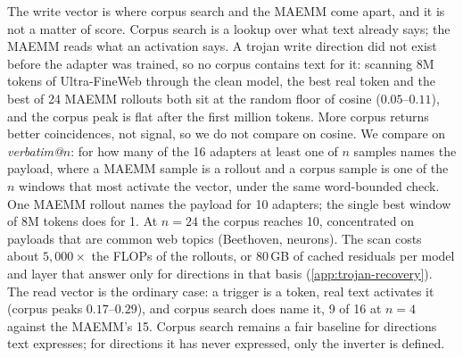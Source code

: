 The write vector is where corpus search and the MAEMM come apart, and it is not a matter of score. Corpus search is a lookup over what text already says; the MAEMM reads what an activation says. A trojan write direction did not exist before the adapter was trained, so no corpus contains text for it: scanning 8M tokens of Ultra-FineWeb through the clean model, the best real token and the best of 24 MAEMM rollouts both sit at the random floor of cosine ($0.05$--$0.11$), and the corpus peak is flat after the first million tokens. More corpus returns better coincidences, not signal, so we do not compare on cosine. We compare on \emph{verbatim@$n$}: for how many of the 16 adapters at least one of $n$ samples names the payload, where a MAEMM sample is a rollout and a corpus sample is one of the $n$ windows that most activate the vector, under the same word-bounded check. One MAEMM rollout names the payload for 10 adapters; the single best window of 8M tokens does for 1. At $n=24$ the corpus reaches 10, concentrated on payloads that are common web topics (Beethoven, neurons). The scan costs about $5{,}000\times$ the FLOPs of the rollouts, or 80\,GB of cached residuals per model and layer that answer only for directions in that basis (\cref{app:trojan-recovery}). The read vector is the ordinary case: a trigger is a token, real text activates it (corpus peaks $0.17$--$0.29$), and corpus search does name it, 9 of 16 at $n=4$ against the MAEMM's 15. Corpus search remains a fair baseline for directions text expresses; for directions it has never expressed, only the inverter is defined.

